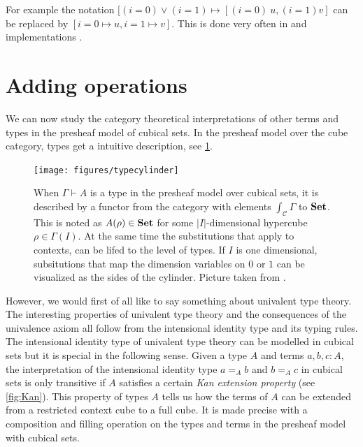 \documentclass[12pt,a4paper,twoside,xetex]{book}
\newcommand{\keyword}[1]{\emph{#1}\index{#1}}
\begin{document}
For example the notation $[(i = 0) \vee (i=1) \mapsto [(i=0) \ u, (i=1) v]$ can be replaced by $[i=0 \mapsto u, i=1 \mapsto v]$. This is done very often in \cite{Huber2016} and implementations \cite{Moertberg2018}.

\section{Adding operations}\label{extraops}

We can now study the category theoretical interpretations of other terms and types in the presheaf model of cubical sets. In the presheaf model over the cube category, types get a intuitive description, see \cref{hubtypes}. 

\begin{figure}\label{hubtypes}
 \centering
 
 \texttt{[image: figures/typecylinder]}
 
 \caption{When $\Gamma \vdash A$ is a type in the presheaf model over cubical sets, it is described by a functor from the category with elements $\int_{\mathcal{C}} \Gamma$ to $\text{\textbf{Set}}$. 
 This is noted as $A(\rho) \in \text{\textbf{Set}}$ for some $|I|$-dimensional hypercube $\rho \in \Gamma (I)$. At the same time the substitutions that apply to contexts, can be lifed to the level of types. If $I$ is one dimensional, subsitutions that map the dimension variables on $0$ or $1$ can be visualized as the sides of the cylinder. Picture taken from \cite{Huber2016def}.}
\end{figure}


However, we would first of all like to say something about univalent type theory. The interesting properties of univalent type theory and the consequences of the univalence axiom all follow from the intensional identity type and its typing rules. The intensional identity type of univalent type theory can be modelled in cubical sets but it is special in the following sense. Given a type $A$ and terms $a,b,c:A$, the interpretation of the intensional identity type $a =_A b$ and $b=_A c$  in cubical sets is only transitive if $A$ satisfies a certain \keyword{Kan extension property} (see \cref{fig:Kan}). This property of types $A$ tells us how the terms of $A$ can be extended from a restricted context cube to a full cube. It is made precise with a composition and filling operation on the types and terms in the presheaf model with cubical sets.
\end{document}
